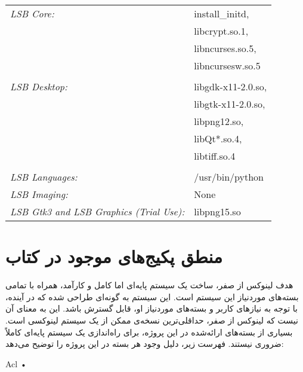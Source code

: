 \documentclass{book}
\begin{document}
\begin{LTR} 

	\vspace{0.1cm}

	\begin{tabular}{@{} l l @{}}
		\textit{LSB Core:} & install\_initd,\\ 
					& libcrypt.so.1,\\
					& libncurses.so.5,\\
					& libncursesw.so.5\\
					\\
		\textit{LSB Desktop:} & libgdk-x11-2.0.so,\\
						&  libgtk-x11-2.0.so,\\
						& libpng12.so,\\
						& libQt*.so.4,\\
						& libtiff.so.4\\
						\\
		\textit{LSB Languages:} & /usr/bin/python \\
		\textit{LSB Imaging:} & None\\
		\textit{LSB Gtk3 and LSB Graphics (Trial Use):} & libpng15.so \\
	\end{tabular}

\end{LTR}

\vspace{0.5cm}



\newpage

\section{منطق پکیج‌های موجود در کتاب}

هدف لینوکس از صفر، ساخت یک سیستم پایه‌ای اما کامل و کارآمد، همراه با تمامی بسته‌های موردنیاز این سیستم است. این سیستم به گونه‌ای طراحی شده که در آینده، با توجه به نیازهای کاربر و بسته‌های موردنیاز او، قابل گسترش باشد.
\newline
این به معنای آن نیست که لینوکس از صفر، حداقلی‌ترین نسخه‌ی ممکن از یک سیستم لینوکسی است. بسیاری از بسته‌های ارائه‌شده در این پروژه، برای راه‌اندازی یک سیستم پایه‌ای کاملاً ضروری نیستند. فهرست زیر، دلیل وجود هر بسته در این پروژه را توضیح می‌دهد:

\begin{flushleft}


	Acl  •
	
\end{flushleft}
\end{document}
